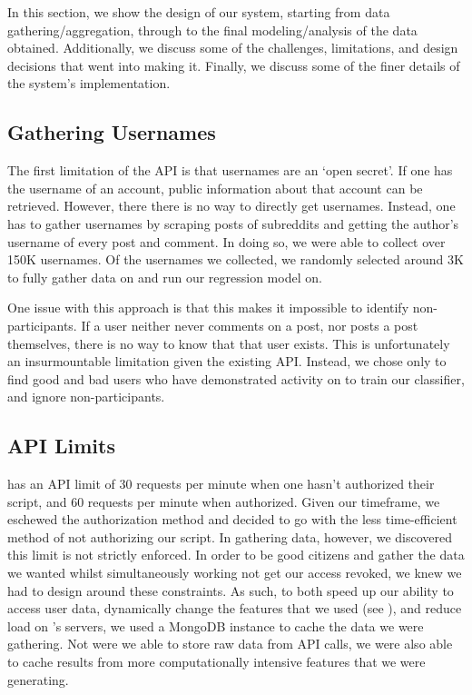 In this section, we show the design of our system, starting from data
gathering/aggregation, through to the final modeling/analysis of the data
obtained. Additionally, we discuss some of the challenges, limitations, and
design decisions that went into making it.  Finally, we discuss some of the
finer details of the system's implementation.

\subsection{Gathering \reddit{} Usernames} %
\label{sub:gathering_reddit_usernames}

The first limitation of the \reddit{} API is that usernames are an `open
secret'. If one has the username of an account, public information about that
account can be retrieved. However, there there is no way to directly get
usernames.  Instead, one has to gather usernames by scraping posts of subreddits
and getting the author's username of every post and comment. In doing so, we
were able to collect over 150K usernames. Of the usernames we collected, we
randomly selected around 3K to fully gather data on and run our regression model
on.

One issue with this approach is that this makes it impossible to identify non-
participants. If a user neither never comments on a post, nor posts a post
themselves, there is no way to know that that user exists. This is unfortunately
an insurmountable limitation given the existing API. Instead, we chose only to
find good and bad users who have demonstrated activity on \reddit{} to train our
classifier, and ignore non-participants.


\subsection{\reddit{} API Limits} %
\label{sub:reddit_api_limits}

\reddit{} has an API limit of 30 requests per minute when one hasn't authorized
their script, and 60 requests per minute when authorized. Given our timeframe,
we eschewed the authorization method and decided to go with the less
time-efficient method of not authorizing our script. In gathering data, however,
we discovered this limit is not strictly enforced. In order to be good citizens
and gather the data we wanted whilst simultaneously working not get our access
revoked, we knew we had to design around these constraints. As such, to both
speed up our ability to access user data, dynamically change the features that
we used (see ), and reduce load on \reddit{}'s
servers, we used a MongoDB instance to cache the data we were gathering. Not
were we able to store raw data from \reddit{} API calls, we were also able to
cache results from more computationally intensive features that we were
generating.

